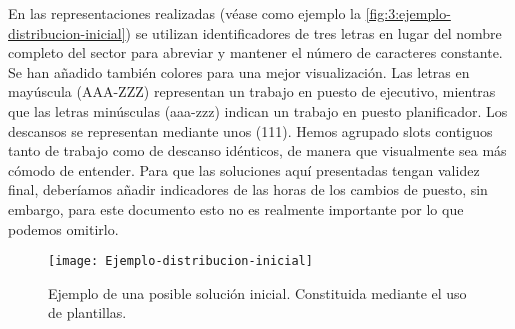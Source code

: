 En las representaciones realizadas (véase como ejemplo la \autoref{fig:3:ejemplo-distribucion-inicial}) se utilizan identificadores de tres letras en lugar del nombre completo del sector para abreviar y mantener el número de caracteres constante.
Se han añadido también colores para una mejor visualización.
Las letras en mayúscula (AAA-ZZZ) representan un trabajo en puesto de ejecutivo, mientras que las letras minúsculas (aaa-zzz) indican un trabajo en puesto planificador. Los descansos se representan mediante unos (111).
Hemos agrupado slots contiguos tanto de trabajo como de descanso idénticos, de manera que visualmente sea más cómodo de entender. Para que las soluciones aquí presentadas tengan validez final, deberíamos añadir indicadores de las horas de los cambios de puesto, sin embargo, para este documento esto no es realmente importante por lo que podemos omitirlo.



\begin{figure}[htbp]
	\centering
	\texttt{[image: Ejemplo-distribucion-inicial]}
	\caption[Ejemplo de una solución inicial]{Ejemplo de una posible solución inicial. Constituida mediante el uso 
		de plantillas.}
	\label{fig:3:ejemplo-distribucion-inicial}
\end{figure}





